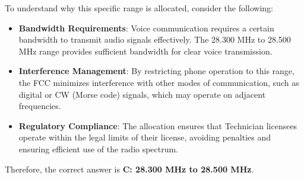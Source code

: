 To understand why this specific range is allocated, consider the following:
\begin{itemize}
    \item \textbf{Bandwidth Requirements}: Voice communication requires a certain bandwidth to transmit audio signals effectively. The 28.300 MHz to 28.500 MHz range provides sufficient bandwidth for clear voice transmission.
    \item \textbf{Interference Management}: By restricting phone operation to this range, the FCC minimizes interference with other modes of communication, such as digital or CW (Morse code) signals, which may operate on adjacent frequencies.
    \item \textbf{Regulatory Compliance}: The allocation ensures that Technician licensees operate within the legal limits of their license, avoiding penalties and ensuring efficient use of the radio spectrum.
\end{itemize}

Therefore, the correct answer is \textbf{C: 28.300 MHz to 28.500 MHz}.

